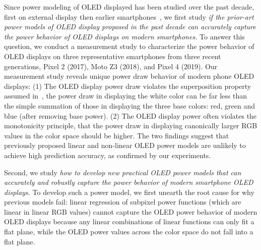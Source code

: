 Since power modeling of OLED displayed has been studied
over the past decade, first on external display then
earlier smartphones~\cite{dong2009current,kim2013runtime,park2015accurate},
we first study {\em if the prior-art power models of OLED display proposed
  in the past decade can accurately capture the power behavior of OLED
  displays on modern smartphones.}  To answer this question, we
conduct a measurement study to characterize the power behavior of OLED
displays on three representative smartphones from 
three recent generations, Pixel 2 (2017), Moto Z3 (2018), and Pixel 4 (2019).
%
Our measurement study reveals
unique power draw behavior of modern phone OLED displays: (1) The OLED
display power draw violates the superposition property assumed
in~\cite{dong2009current}, \eg the power draw in displaying
the white color can be far less than the simple summation of those in
displaying the three base colors: red, green and blue (after removing
base power).  (2) The OLED
display power often violates the  monotonicity principle, that
the power draw in displaying canonically larger RGB values in the color
space should be higher.
The two findings suggest that previously proposed
linear and non-linear OLED power models are unlikely to achieve high
prediction accuracy, as confirmed by our experiments.

Second, we study {\em how to develop new practical OLED power models that
  can accurately and robustly capture the power behavior of modern smartphone OLED
  displays.}  To develop such a power model,
we first unearth the root cause for why previous models fail:
linear regression of subpixel power functions (which are linear in linear RGB
values)
cannot capture the OLED power behavior of modern OLED displays
because any linear combinations of linear functions 
can only fit a flat plane, while the OLED power
values across the color space do not fall into a flat plane.

